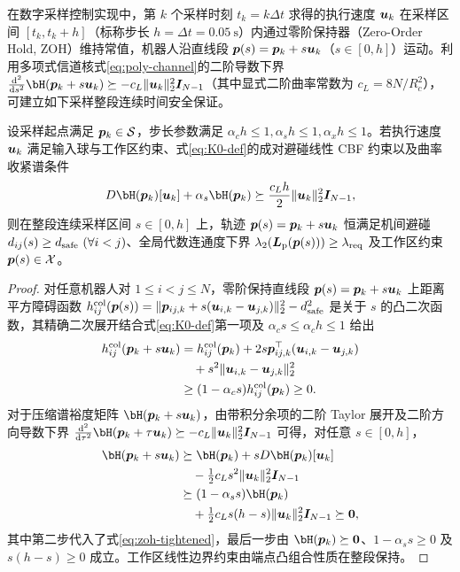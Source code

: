 在数字采样控制实现中，第 $k$ 个采样时刻 $t_k=k\Delta t$ 求得的执行速度 $\boldsymbol{u}_k$ 在采样区间 $[t_k,t_k+h]$（标称步长 $h=\Delta t=0.05\ \mathrm s$）内通过零阶保持器（Zero-Order Hold, ZOH）维持常值，机器人沿直线段 $\boldsymbol{p}(s)=\boldsymbol{p}_k+s\boldsymbol{u}_k$（$s\in[0,h]$）运动。利用多项式信道核式\eqref{eq:poly-channel}的二阶导数下界 $\frac{\mathrm d^2}{\mathrm ds^2}\bH(\bp_k+s\bu_k)\succeq -c_L\norm{\bu_k}_2^2\I_{N-1}$（其中显式二阶曲率常数为 $c_L=8N/R_c^2$），可建立如下采样整段连续时间安全保证。

\begin{theorem}[零阶保持执行段的连续时间安全性]\label{thm:zoh-safe}
设采样起点满足 $\boldsymbol{p}_k\in\mathcal S$，步长参数满足 $\alpha_c h\le 1,\alpha_s h\le 1,\alpha_x h\le 1$。若执行速度 $\boldsymbol{u}_k$ 满足输入球与工作区约束、式\eqref{eq:K0-def}的成对避碰线性 CBF 约束以及曲率收紧谱条件
\begin{equation}
 D\bH(\bp_k)[\bu_k]+\alpha_s\bH(\bp_k)\succeq\frac{c_L h}{2}\norm{\bu_k}_2^2\I_{N-1},
 \label{eq:zoh-tightened}
\end{equation}
则在整段连续采样区间 $s\in[0,h]$ 上，轨迹 $\boldsymbol{p}(s)=\boldsymbol{p}_k+s\boldsymbol{u}_k$ 恒满足机间避碰 $d_{ij}(s)\ge d_{\mathrm{safe}}\ (\forall i<j)$、全局代数连通度下界 $\lambda_2(\boldsymbol{L}_{\mathrm{p}}(\boldsymbol{p}(s)))\ge\lambda_{\mathrm{req}}$ 及工作区约束 $\boldsymbol{p}(s)\in\mathcal X$。
\end{theorem}
\begin{proof}
对任意机器人对 $1\le i<j\le N$，零阶保持直线段 $\boldsymbol{p}(s)=\boldsymbol{p}_k+s\boldsymbol{u}_k$ 上距离平方障碍函数 $h_{ij}^{\mathrm{col}}(\boldsymbol{p}(s))=\lVert\boldsymbol{p}_{ij,k}+s(\boldsymbol{u}_{i,k}-\boldsymbol{u}_{j,k})\rVert_2^2-d_{\mathrm{safe}}^2$ 是关于 $s$ 的凸二次函数，其精确二次展开结合式\eqref{eq:K0-def}第一项及 $\alpha_c s\le\alpha_c h\le 1$ 给出
\begin{equation}
\begin{split}
 h_{ij}^{\mathrm{col}}(\boldsymbol{p}_k+s\boldsymbol{u}_k)&=h_{ij}^{\mathrm{col}}(\boldsymbol{p}_k)+2s\boldsymbol{p}_{ij,k}^{\top}(\boldsymbol{u}_{i,k}-\boldsymbol{u}_{j,k})\\
 &\quad+s^2\lVert\boldsymbol{u}_{i,k}-\boldsymbol{u}_{j,k}\rVert_2^2\\
 &\ge(1-\alpha_c s)h_{ij}^{\mathrm{col}}(\boldsymbol{p}_k)\ge 0.
\end{split}
\end{equation}
对于压缩谱裕度矩阵 $\bH(\bp_k+s\bu_k)$，由带积分余项的二阶 Taylor 展开及二阶方向导数下界 $\frac{\mathrm d^2}{\mathrm d\tau^2}\bH(\bp_k+\tau\bu_k)\succeq -c_L\norm{\bu_k}_2^2\I_{N-1}$ 可得，对任意 $s\in[0,h]$，
\begin{equation}
\begin{split}
 \bH(\bp_k+s\bu_k)&\succeq\bH(\bp_k)+sD\bH(\bp_k)[\bu_k]\\
 &\quad-\tfrac12 c_L s^2\norm{\bu_k}_2^2\I_{N-1}\\
 &\succeq(1-\alpha_s s)\bH(\bp_k)\\
 &\quad+\tfrac12 c_L s(h-s)\norm{\bu_k}_2^2\I_{N-1}\succeq\boldsymbol 0,
\end{split}
\end{equation}
其中第二步代入了式\eqref{eq:zoh-tightened}，最后一步由 $\bH(\bp_k)\succeq\boldsymbol 0$、$1-\alpha_s s\ge 0$ 及 $s(h-s)\ge 0$ 成立。工作区线性边界约束由端点凸组合性质在整段保持。
\end{proof}

